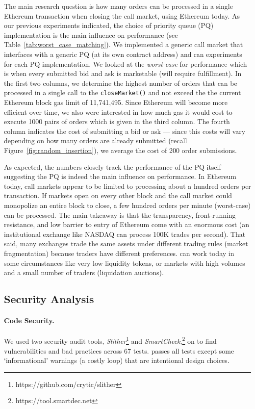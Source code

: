  
 
The main research question is how many orders can be processed in a single Ethereum transaction when closing the call market, using Ethereum today. As our previous experiments indicated, the choice of priority queue (PQ) implementation is the main influence on performance (see Table~\ref{tab:worst_case_matching}). We implemented a generic call market that interfaces with a generic PQ (at its own contract address) and ran experiments for each PQ implementation. We looked at the \textit{worst-case} for performance which is when every submitted bid and ask is marketable (\ie will require fulfillment). In the first two columns, we determine the highest number of orders that can be processed in a single call to the \texttt{closeMarket()} and not exceed the the current Ethereum block gas limit of 11,741,495. Since Ethereum will become more efficient over time, we also were interested in how much gas it would cost to execute 1000 pairs of orders which is given in the third column. The fourth column indicates the cost of submitting a bid or ask --- since this costs will vary depending on how many orders are already submitted (recall Figure~\ref{fig:random_insertion}), we average the cost of 200 order submissions. 

As expected, the numbers closely track the performance of the PQ itself suggesting the PQ is indeed the main influence on performance. In Ethereum today, call markets appear to be limited to processing about a hundred orders per transaction. If markets open on every other block and the call market could monopolize an entire block to close, a few hundred orders per minute (worst-case) can be processed. The main takeaway is that the transparency, front-running resistance, and low barrier to entry of Ethereum come with an enormous cost (\ie an institutional exchange like NASDAQ can process 100K trades per second). That said, many exchanges trade the same assets under different trading rules (\ie market fragmentation) because traders have different preferences. \cm can work today in some circumstances like very low liquidity tokens, or markets with high volumes and a small number of traders (\eg liquidation auctions). 

\subsection{Security Analysis} \label{sec:front}

\paragraph{Code Security.} We used two security audit tools, \textit{Slither}\footnote{https://github.com/crytic/slither} and \textit{SmartCheck},\footnote{https://tool.smartdec.net} on \cm to find vulnerabilities and bad practices across 67 tests. \cm passes all tests except some `informational' warnings (\eg a costly loop) that are intentional design choices.

